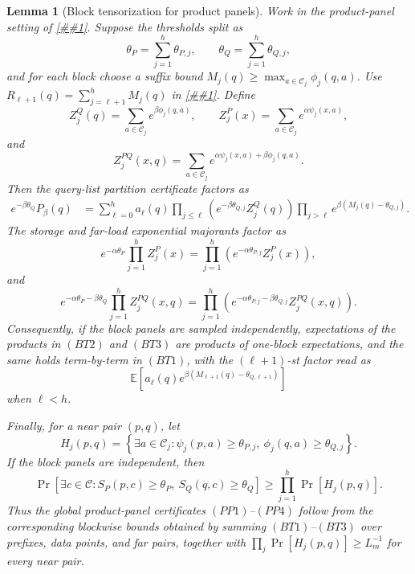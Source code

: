 \documentclass[10pt]{article}
\newcommand{\cref}[1]{\ref{##1}}
\newtheorem{lemma}[theorem]{Lemma}
\theoremstyle{definition}
\newcommand{\E}{\mathbb{E}}
\begin{document}
\begin{lemma}[Block tensorization for product panels]
   \label{lem:product-panel-tensorization}
   Work in the product-panel setting of
   \cref{prop:product-panel-spectrum-compiler}.  Suppose the thresholds split
   as
   \[
      \theta_P=\sum_{j=1}^h\theta_{P,j},
      \qquad
      \theta_Q=\sum_{j=1}^h\theta_{Q,j},
   \]
   and for each block choose a suffix bound
   \(M_j(q)\ge\max_{a\in\mathcal C_j}\phi_j(q,a)\).  Use
   \(R_{\ell+1}(q)=\sum_{j=\ell+1}^hM_j(q)\) in
   \cref{lem:additive-product-panel-decoder}.  Define
   \[
      Z_j^Q(q)=\sum_{a\in\mathcal C_j}e^{\beta\phi_j(q,a)},
      \qquad
      Z_j^P(x)=\sum_{a\in\mathcal C_j}e^{\alpha\psi_j(x,a)},
   \]
   and
   \[
      Z_j^{PQ}(x,q)=
      \sum_{a\in\mathcal C_j}
      e^{\alpha\psi_j(x,a)+\beta\phi_j(q,a)} .
   \]
   Then the query-list partition certificate factors as
   \[
   \begin{aligned}
      e^{-\beta\theta_Q}P_\beta(q)
      &=
      \sum_{\ell=0}^{h}
      a_\ell(q)
      \prod_{j\le\ell}
      \left(e^{-\beta\theta_{Q,j}}Z_j^Q(q)\right)
      \prod_{j>\ell}
      e^{\beta(M_j(q)-\theta_{Q,j})}.
   \end{aligned}
   \tag{BT1}
   \]
   The storage and far-load exponential majorants factor as
   \[
      e^{-\alpha\theta_P}
      \prod_{j=1}^hZ_j^P(x)
      =
      \prod_{j=1}^h
      \left(e^{-\alpha\theta_{P,j}}Z_j^P(x)\right),
      \tag{BT2}
   \]
   and
   \[
      e^{-\alpha\theta_P-\beta\theta_Q}
      \prod_{j=1}^h Z_j^{PQ}(x,q)
      =
      \prod_{j=1}^h
      \left(
      e^{-\alpha\theta_{P,j}-\beta\theta_{Q,j}}
      Z_j^{PQ}(x,q)
      \right).
      \tag{BT3}
   \]
   Consequently, if the block panels are sampled independently, expectations of
   the products in \((BT2)\) and \((BT3)\) are products of one-block
   expectations, and the same holds term-by-term in \((BT1)\), with the
   \((\ell+1)\)-st factor read as
   \[
      \E\!\left[
      a_\ell(q)e^{\beta(M_{\ell+1}(q)-\theta_{Q,\ell+1})}
      \right]
   \]
   when \(\ell<h\).

   Finally, for a near pair \((p,q)\), let
   \[
      H_j(p,q)=
      \left\{
      \exists a\in\mathcal C_j:
      \psi_j(p,a)\ge\theta_{P,j},\
      \phi_j(q,a)\ge\theta_{Q,j}
      \right\}.
   \]
   If the block panels are independent, then
   \[
      \Pr\!\left[
      \exists c\in\mathcal C:
      S_P(p,c)\ge\theta_P,\ S_Q(q,c)\ge\theta_Q
      \right]
      \ge
      \prod_{j=1}^h\Pr[H_j(p,q)].
      \tag{BT4}
   \]
   Thus the global product-panel certificates \((PP1)\)--\((PP4)\) follow from
   the corresponding blockwise bounds obtained by summing \((BT1)\)--\((BT3)\)
   over prefixes, data points, and far pairs, together with
   \(\prod_j\Pr[H_j(p,q)]\ge L_m^{-1}\) for every near pair.
\end{lemma}
\end{document}
